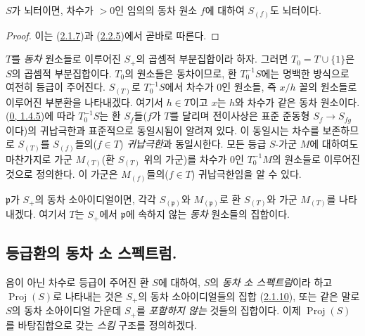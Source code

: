 \begin{corollary}[2.2.6]
\label{II.2.2.6-ko}
$S$가 뇌터이면, 차수가 $>0$인 임의의 동차 원소 $f$에 대하여
$S_{(f)}$도 뇌터이다.
\end{corollary}

\begin{proof}
이는 (\hyperref[II.2.1.7-ko]{2.1.7})과
(\hyperref[II.2.2.5-ko]{2.2.5})에서 곧바로 따른다.
\end{proof}

\begin{env}[2.2.7]
\label{II.2.2.7-ko}
$T$를 \emph{동차} 원소들로 이루어진 $S_+$의 곱셈적 부분집합이라 하자.
그러면 $T_0=T\cup\{1\}$은 $S$의 곱셈적 부분집합이다. $T_0$의
원소들은 동차이므로, 환 $T_0^{-1}S$에는 명백한 방식으로 여전히 등급이
주어진다. $S_{(T)}$로 $T_0^{-1}S$에서 차수가 $0$인 원소들, 즉
$x/h$ 꼴의 원소들로 이루어진 부분환을 나타내겠다. 여기서 $h\in T$이고
$x$는 $h$와 차수가 같은 동차 원소이다.
(\hyperref[0.1.4.5-ko]{0, 1.4.5})에 따라 $T_0^{-1}S$는 환
$S_f$들($f$가 $T$를 달리며 전이사상은 표준 준동형
$S_f\to S_{fg}$이다)의 귀납극한과 표준적으로 동일시됨이 알려져 있다.
이 동일시는 차수를 보존하므로 $S_{(T)}$를
$S_{(f)}$들의($f\in T$) \emph{귀납극한}과 동일시한다. 모든 등급
$S$-가군 $M$에 대하여도 마찬가지로 가군 $M_{(T)}$(환 $S_{(T)}$ 위의
가군)를 차수가 $0$인 $T_0^{-1}M$의 원소들로 이루어진 것으로 정의한다.
이 가군은 $M_{(f)}$들의($f\in T$) 귀납극한임을 알 수 있다.

$\mathfrak{p}$가 $S_+$의 동차 소아이디얼이면, 각각
$S_{(\mathfrak{p})}$와 $M_{(\mathfrak{p})}$로 환 $S_{(T)}$와 가군
$M_{(T)}$를 나타내겠다. 여기서 $T$는 $S_+$에서 $\mathfrak{p}$에
속하지 않는 \emph{동차} 원소들의 집합이다.
\end{env}

\subsection{등급환의 동차 소 스펙트럼.}
\label{subsection:II.2.3-ko}

\begin{env}[2.3.1]
\label{II.2.3.1-ko}
음이 아닌 차수로 등급이 주어진 환 $S$에 대하여, $S$의
\emph{동차 소 스펙트럼}이라 하고 $\operatorname{Proj}(S)$로 나타내는 것은
$S_+$의 동차 소아이디얼들의 집합
(\hyperref[II.2.1.10-ko]{2.1.10}), 또는 같은 말로 $S$의 동차
소아이디얼 가운데 $S_+$를 \emph{포함하지 않는} 것들의 집합이다. 이제
$\operatorname{Proj}(S)$를 바탕집합으로 갖는 \emph{스킴} 구조를 정의하겠다.
\end{env}

